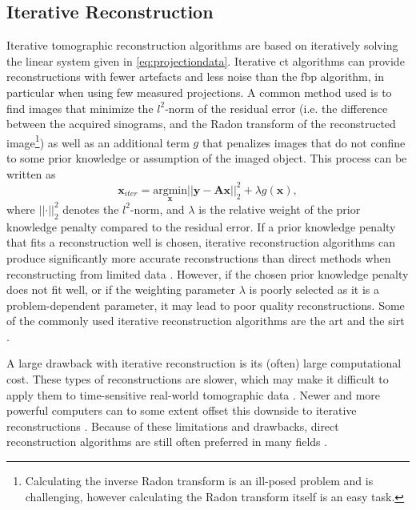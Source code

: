 \subsection{Iterative Reconstruction}
\label{sec:ct:reconstruction:iterative}
Iterative tomographic reconstruction algorithms are based on iteratively solving the linear system given in \cref{eq:projectiondata}. Iterative \gls{ct} algorithms can provide reconstructions with fewer artefacts and less noise than the \gls{fbp} algorithm, in particular when using few measured projections. A common method used is to find images that minimize the $l^2$-norm of the residual error (i.e. the difference between the acquired sinograms, and the Radon transform of the reconstructed image\footnote{Calculating the inverse Radon transform is an ill-posed problem and is challenging, however calculating the Radon transform itself is an easy task. }) as well as an additional term $g$ that penalizes images that do not confine to some prior knowledge or assumption of the imaged object. This process can be written as \cite{jimaging4110128}
\begin{equation}
    \label{eq:iterativesolution}
    \bm{x}_{iter} = \underset{\bm{x}}{\text{argmin}} \left|\left|\bm{y} - \bm{A}\bm{x}\right|\right|_2^2 + \lambda g(\bm{x}),
\end{equation}
where $\left|\left| \bm{\cdot} \right|\right|_2^2$ denotes the $l^2$-norm, and $\lambda$ is the relative weight of the prior knowledge penalty compared to the residual error. If a prior knowledge penalty that fits a reconstruction well is chosen, iterative reconstruction algorithms can produce significantly more accurate reconstructions than direct methods when reconstructing from limited data \cite{jimaging4110128}. However, if the chosen prior knowledge penalty does not fit well, or if the weighting parameter $\lambda$ is poorly selected as it is a problem-dependent parameter, it may lead to poor quality reconstructions. Some of the commonly used iterative reconstruction algorithms are the \gls{art} and the \gls{sirt} \cite[283-284]{KakSlaney98}. 

A large drawback with iterative reconstruction is its (often) large computational cost. These types of reconstructions are slower, which may make it difficult to apply them to time-sensitive real-world tomographic data \cite{jimaging4110128}. Newer and more powerful computers can to some extent offset this downside to iterative reconstructions \cite{willemink2013iterative}. Because of these limitations and drawbacks, direct reconstruction algorithms are still often preferred in many fields \cite{Pan_2009}. 

